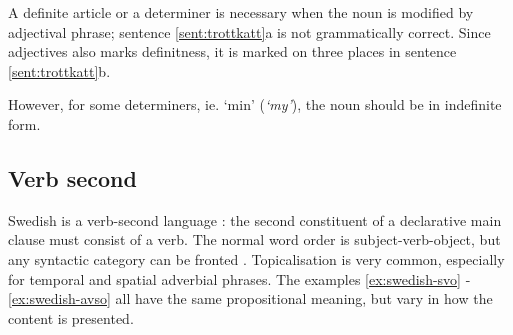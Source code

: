 \documentclass{report}
\begin{document}
A definite article or a determiner is necessary when the noun is modified by adjectival
phrase; sentence \ref{sent:trottkatt}a is not grammatically correct.
Since adjectives also marks definitness, it is marked on three places
in sentence \ref{sent:trottkatt}b. %

\label{sent:trottkatt}
However, for some determiners, ie. `min' (\emph{`my'}), the noun should be in indefinite form.

\enumsentence{\longexnt{3}{3}
{Min &trötta& katt.} %
{`My & tired & cat'}
{ $[${\sc+def}$]$ &$[${\sc+def}$]$& $[${\sc-def}$]$} %
{}}



\subsection*{Verb second}
Swedish is a verb-second language \cite[p.116]{gunlog}: the
second constituent of a declarative main clause must consist of a verb.
The normal word order is subject-verb-object, but any syntactic category can be
fronted \cite[]{H&H}.
Topicalisation is very common, especially for temporal and spatial adverbial phrases.
The examples \ref{ex:swedish-svo} - \ref{ex:swedish-avso} all have the same propositional
meaning, but vary in how the content is presented.
 \label{ex:swedish-svo}
\vspace{-3mm}
\label{ex:swedish-ovs} 
\vspace{-3mm}
 \label{ex:swedish-avso}
\end{document}

